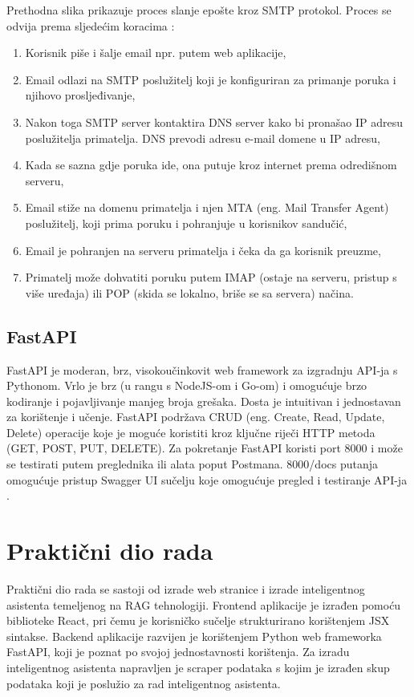 \documentclass[]{foi}
\begin{document}
Prethodna slika prikazuje proces slanje epošte kroz SMTP protokol. Proces se odvija prema sljedećim koracima \cite{gillisSMTP}:
\begin{enumerate}
    \item Korisnik piše i šalje email npr. putem web aplikacije,
    \item Email odlazi na SMTP poslužitelj koji je konfiguriran za primanje poruka i njihovo prosljeđivanje,
    \item Nakon toga SMTP server kontaktira DNS server kako bi pronašao IP adresu poslužitelja primatelja. DNS prevodi adresu e-mail domene u IP adresu,
    \item Kada se sazna gdje poruka ide, ona putuje kroz internet prema odredišnom serveru,
    \item Email stiže na domenu primatelja i njen MTA (eng. Mail Transfer Agent) poslužitelj, koji prima poruku i pohranjuje u korisnikov sandučić,
    \item Email je pohranjen na serveru primatelja i čeka da ga korisnik preuzme,
    \item Primatelj može dohvatiti poruku putem IMAP (ostaje na serveru, pristup s više uređaja) ili POP (skida se lokalno, briše se sa servera) načina.
\end{enumerate}
\newpage
\section{FastAPI}
FastAPI je moderan, brz, visokoučinkovit web framework za izgradnju API-ja s Pythonom. Vrlo je brz (u rangu s NodeJS-om i Go-om) i
omogućuje brzo kodiranje i pojavljivanje manjeg broja grešaka. Dosta je intuitivan i jednostavan za korištenje i učenje. FastAPI podržava CRUD
(eng. Create, Read, Update, Delete) operacije koje je moguće koristiti kroz ključne riječi HTTP metoda (GET, POST, PUT, DELETE). Za pokretanje
FastAPI koristi port 8000 i može se testirati putem preglednika ili alata poput Postmana. 8000/docs putanja omogućuje pristup
Swagger UI sučelju koje omogućuje pregled i testiranje API-ja \cite{obafemi2025fastapi}. 


\chapter{Praktični dio rada}
Praktični dio rada se sastoji od izrade web stranice i izrade inteligentnog asistenta temeljenog na RAG tehnologiji. Frontend aplikacije
je izrađen pomoću biblioteke React, pri čemu je korisničko sučelje strukturirano korištenjem JSX sintakse. Backend aplikacije razvijen je korištenjem Python web frameworka FastAPI, 
koji je poznat po svojoj jednostavnosti korištenja. Za izradu inteligentnog asistenta napravljen je scraper podataka s kojim je izrađen skup podataka koji je poslužio za rad inteligentnog
asistenta.
\end{document}
